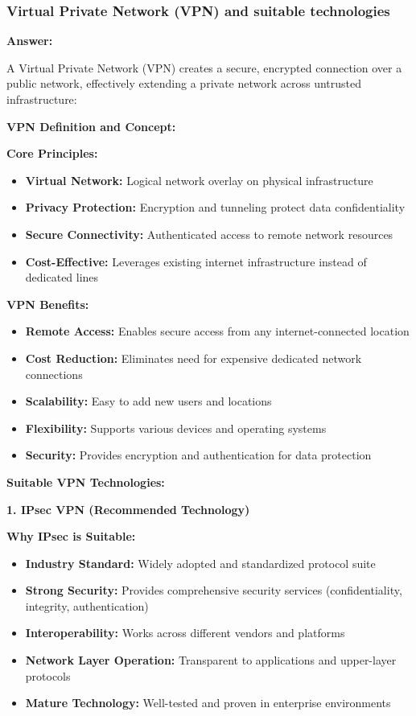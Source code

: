 \documentclass[12pt,a4paper]{article}
\begin{document}
\subsubsection{Virtual Private Network (VPN) and suitable technologies}

\textbf{Answer:}

A Virtual Private Network (VPN) creates a secure, encrypted connection over a public network, effectively extending a private network across untrusted infrastructure:

\textbf{VPN Definition and Concept:}

\textbf{Core Principles:}
\begin{itemize}
    \item \textbf{Virtual Network:} Logical network overlay on physical infrastructure
    \item \textbf{Privacy Protection:} Encryption and tunneling protect data confidentiality
    \item \textbf{Secure Connectivity:} Authenticated access to remote network resources
    \item \textbf{Cost-Effective:} Leverages existing internet infrastructure instead of dedicated lines
\end{itemize}

\textbf{VPN Benefits:}
\begin{itemize}
    \item \textbf{Remote Access:} Enables secure access from any internet-connected location
    \item \textbf{Cost Reduction:} Eliminates need for expensive dedicated network connections
    \item \textbf{Scalability:} Easy to add new users and locations
    \item \textbf{Flexibility:} Supports various devices and operating systems
    \item \textbf{Security:} Provides encryption and authentication for data protection
\end{itemize}

\textbf{Suitable VPN Technologies:}

\textbf{1. IPsec VPN (Recommended Technology)}

\textbf{Why IPsec is Suitable:}
\begin{itemize}
    \item \textbf{Industry Standard:} Widely adopted and standardized protocol suite
    \item \textbf{Strong Security:} Provides comprehensive security services (confidentiality, integrity, authentication)
    \item \textbf{Interoperability:} Works across different vendors and platforms
    \item \textbf{Network Layer Operation:} Transparent to applications and upper-layer protocols
    \item \textbf{Mature Technology:} Well-tested and proven in enterprise environments
\end{itemize}
\end{document}
